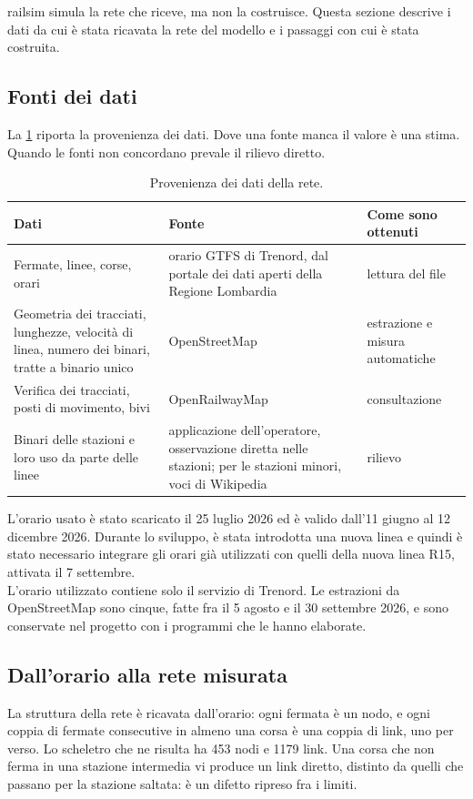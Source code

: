 railsim simula la rete che riceve, ma non la costruisce. Questa sezione descrive i dati da cui è stata ricavata la rete del modello e i passaggi con cui è stata costruita.

\subsection{Fonti dei dati}
\label{sec:fonti-dati}
La \cref{tab:dati-provenienza} riporta la provenienza dei dati. Dove una fonte manca il valore è una stima. Quando le fonti non concordano prevale il rilievo diretto.

\begin{table}[H]
	\centering
	\caption{Provenienza dei dati della rete.}
	\label{tab:dati-provenienza}
	\small
	\begin{tabularx}{\textwidth}{>{\raggedright\arraybackslash}p{}>{\raggedright\arraybackslash}X>{\raggedright\arraybackslash}p{}}
		\toprule
		Dati & Fonte & Come sono ottenuti \\
		\midrule
		Fermate, linee, corse, orari & orario GTFS di Trenord, dal portale dei dati aperti della Regione Lombardia~\cite{trenord_gtfs} & lettura del file \\
		Geometria dei tracciati, lunghezze, velocità di linea, numero dei binari, tratte a binario unico & OpenStreetMap~\cite{openstreetmap} & estrazione e misura automatiche \\
		Verifica dei tracciati, posti di movimento, bivi & OpenRailwayMap~\cite{openrailwaymap} & consultazione \\
		Binari delle stazioni e loro uso da parte delle linee & applicazione dell'operatore, osservazione diretta nelle stazioni; per le stazioni minori, voci di Wikipedia & rilievo \\
		\bottomrule
	\end{tabularx}
\end{table}

L'orario usato è stato scaricato il 25 luglio 2026 ed è valido dall'11 giugno al 12 dicembre 2026. Durante lo sviluppo, è stata introdotta una nuova linea e quindi è stato necessario integrare gli orari già utilizzati con quelli della nuova linea R15, attivata il 7 settembre.\\
L'orario utilizzato contiene solo il servizio di Trenord. Le estrazioni da OpenStreetMap sono cinque, fatte fra il 5 agosto e il 30 settembre 2026, e sono conservate nel progetto con i programmi che le hanno elaborate.

\subsection{Dall'orario alla rete misurata}
La struttura della rete è ricavata dall'orario: ogni fermata è un nodo, e ogni coppia di fermate consecutive in almeno una corsa è una coppia di link, uno per verso. Lo scheletro che ne risulta ha 453 nodi e 1179 link. Una corsa che non ferma in una stazione intermedia vi produce un link diretto, distinto da quelli che passano per la stazione saltata: è un difetto ripreso fra i limiti.

